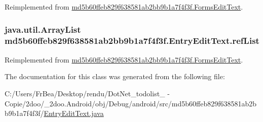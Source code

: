 Reimplemented from \hyperlink{classmd5b60ffeb829f638581ab2bb9b1a7f4f3f_1_1_forms_edit_text_2cbb395bc194ab641c62a79e13d6705f}{md5b60ffeb829f638581ab2bb9b1a7f4f3f.FormsEditText}.\hypertarget{classmd5b60ffeb829f638581ab2bb9b1a7f4f3f_1_1_entry_edit_text_3919b30a60433804ec3826c0a1cafe36}{
\subsubsection[{refList}]{\setlength{\rightskip}{0pt plus 5cm}java.util.ArrayList {\bf md5b60ffeb829f638581ab2bb9b1a7f4f3f.EntryEditText.refList}}}
\label{classmd5b60ffeb829f638581ab2bb9b1a7f4f3f_1_1_entry_edit_text_3919b30a60433804ec3826c0a1cafe36}




Reimplemented from \hyperlink{classmd5b60ffeb829f638581ab2bb9b1a7f4f3f_1_1_forms_edit_text_e4cf7e6b7330b3bf927c0a23059cf810}{md5b60ffeb829f638581ab2bb9b1a7f4f3f.FormsEditText}.

The documentation for this class was generated from the following file:\begin{CompactItemize}
\item 
C:/Users/FrBea/Desktop/rendu/DotNet\_\-todolist\_ - Copie/2doo/\_\-2doo.Android/obj/Debug/android/src/md5b60ffeb829f638581ab2bb9b1a7f4f3f/\hyperlink{_entry_edit_text_8java}{EntryEditText.java}\end{CompactItemize}
